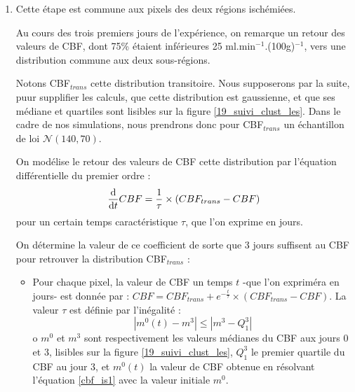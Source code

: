 \begin{enumerate}[label=\textbf{(L\'esion 1 - \arabic*)}]
\item Cette \'etape est commune aux pixels des deux r\'egions isch\'emi\'ees.

\par
Au cours des trois premiers jours de l'exp\'erience, on remarque un retour des valeurs de CBF, %
dont 75\% \'etaient inf\'erieures  25 ml.min${}^{-1}$.(100g)${}^{-1}$, vers une distribution commune aux deux sous-r\'egions.

\par
Notons CBF${}_{trans}$ cette distribution transitoire. Nous supposerons par la suite, puur supplifier les calculs, %
que cette distribution est gaussienne, et que ses m\'ediane et quartiles sont lisibles sur la figure \ref{19_suivi_clust_les}. %
Dans le cadre de nos simulations, nous prendrons donc pour CBF${}_{trans}$ un \'echantillon de loi $\mathcal{N}(140,70)$.

\par
On mod\'elise le retour des valeurs de CBF  cette distribution par l'\'equation diff\'erentielle du premier ordre :
\begin{equation}
\der{CBF}=\frac{1}{\tau}\times \left(CBF_{trans}-CBF\right)%
\label{cbf_is1}
\end{equation}
pour un certain temps caract\'eristique $\tau$, que l'on exprime en jours.

\par
On d\'etermine la valeur de ce coefficient de sorte que 3 jours suffisent au CBF pour retrouver la distribution CBF${}_{trans}$ :
\begin{itemize}
\item Pour chaque pixel, la valeur de CBF  un temps $t$ -que l'on exprim\'era en jours- est donn\'ee par : %
$CBF=CBF_{trans}+e^{-\frac{t}{\tau}}\times\left(CBF_{trans}-CBF\right)$. La valeur $\tau$ est d\'efinie par l'in\'egalit\'e :
\[|m^0(t)-m^3|\leq|m^3-Q_1^3|\]
o $m^0$ et $m^3$ sont respectivement les valeurs m\'edianes du CBF aux jours 0 et 3, lisibles sur la figure \ref{19_suivi_clust_les}, %
$Q_1^3$ le premier quartile du CBF au jour 3, et $m^0(t)$ la valeur de CBF obtenue en r\'esolvant l'\'equation \ref{cbf_is1} avec la valeur initiale $m^0$.


\end{itemize}
\end{enumerate}
